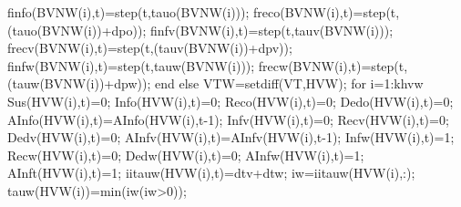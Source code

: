                                           finfo(BVNW(i),t)=step(t,tauo(BVNW(i))); %
                                          freco(BVNW(i),t)=step(t,(tauo(BVNW(i))+dpo)); %
                                          finfv(BVNW(i),t)=step(t,tauv(BVNW(i))); %
                                          frecv(BVNW(i),t)=step(t,(tauv(BVNW(i))+dpv)); %
                                          finfw(BVNW(i),t)=step(t,tauw(BVNW(i))); %
                                          frecw(BVNW(i),t)=step(t,(tauw(BVNW(i))+dpw)); %
                                    end
                               else 
                                    VTW=setdiff(VT,HVW);
                                    for i=1:khvw
                                                Sus(HVW(i),t)=0;
                                                Info(HVW(i),t)=0;
                                                Reco(HVW(i),t)=0;
                                                Dedo(HVW(i),t)=0;
                                                AInfo(HVW(i),t)=AInfo(HVW(i),t-1);
                                                Infv(HVW(i),t)=0;
                                                Recv(HVW(i),t)=0;
                                                Dedv(HVW(i),t)=0;
                                                AInfv(HVW(i),t)=AInfv(HVW(i),t-1); 
                                                Infw(HVW(i),t)=1;
                                                Recw(HVW(i),t)=0;
                                                Dedw(HVW(i),t)=0;
                                                AInfw(HVW(i),t)=1; 
                                                AInft(HVW(i),t)=1; 
                                                iitauw(HVW(i),t)=dtv+dtw; 
                                                iw=iitauw(HVW(i),:);
                                                tauw(HVW(i))=min(iw(iw>0)); 
                                                                                                                                          

